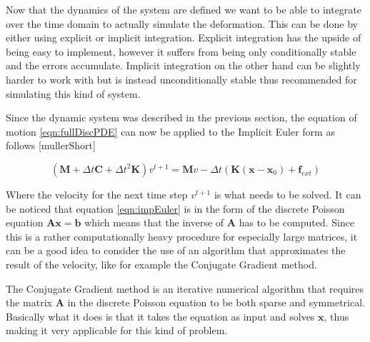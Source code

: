 Now that the dynamics of the system are defined we want to be able to integrate over the time domain to actually simulate the deformation. This can be done by either using explicit or implicit integration. Explicit integration has the upside of being easy to implement, however it suffers from being only conditionally stable and the errors accumulate. Implicit integration on the other hand can be slightly harder to work with but is instead unconditionally stable thus recommended for simulating this kind of system. 

Since the dynamic system was described in the previous section, the equation of motion \ref{eqn:fullDiscPDE} can now be applied to the Implicit Euler form as follows [mullerShort]

\begin{equation}\label{eqn:impEuler}
		(\mathbf{M} + \Delta t  \mathbf{C} + \Delta t^2 \mathbf{K})v^{t+1} = \mathbf{M} v - \Delta t (\mathbf{K}(\mathbf{x} - \mathbf{x}_0) +\mathbf{f}_{ext})
\end{equation}

Where the velocity for the next time step $v^{t+1}$ is what needs to be solved. It can be noticed that equation \ref{eqn:impEuler} is in the form of the discrete Poisson equation $\mathbf{Ax=b}$ which means that the inverse of $\mathbf{A}$ has to be computed. Since this is a rather computationally heavy procedure for especially large matrices, it can be a good idea to consider the use of an algorithm that approximates the result of the velocity, like for example the Conjugate Gradient method.

The Conjugate Gradient method is an iterative numerical algorithm that requires the matrix $\mathbf{A}$ in the discrete Poisson equation to be both sparse and symmetrical. Basically what it does is that it takes the equation as input and solves $\mathbf{x}$, thus making it very applicable for this kind of problem.